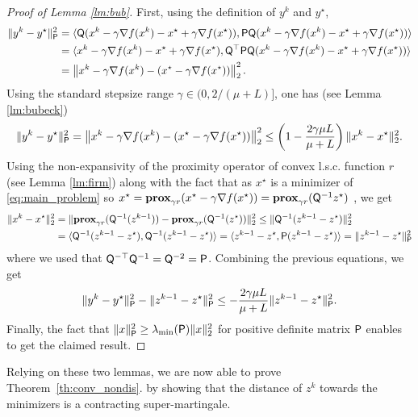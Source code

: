 \begin{proof}[Proof of Lemma \ref{lm:bub}]
First, using the definition of $y^k$ and $y^\star$,
\begin{align*}
  \|y^{k}-y^\star\|_{{\mathsf{P}}}^2
   &=
   \langle {\mathsf{Q}}(x^k - \gamma\nabla f(x^k) - x^\star + \gamma\nabla f(x^\star)), 
   {\mathsf{P}}{\mathsf{Q}}(x^k - \gamma\nabla f(x^k) - x^\star + \gamma\nabla f(x^\star)) \rangle\\
   &=
   \langle x^k - \gamma\nabla f(x^k) - x^\star + \gamma\nabla f(x^\star), {\mathsf{Q}}^\top{\mathsf{P}}{\mathsf{Q}} (x^k - \gamma\nabla f(x^k) - x^\star + \gamma\nabla f(x^\star)) \rangle\\
   &= \left\| x^k - \gamma\nabla f(x^k) - ( x^\star - \gamma\nabla f(x^\star) ) \right\|_2^2.
\end{align*}
Using the standard stepsize range $\gamma\in(0,2/(\mu+L)]$, one has (see Lemma \ref{lm:bubeck}) 
$$
 \|y^{k}-y^\star\|_{{\mathsf{P}}}^2 = \left\| x^k - \gamma\nabla f(x^k) - ( x^\star - \gamma\nabla f(x^\star) ) \right\|_2^2 \leq \left(1 - \frac{2\gamma\mu L}{\mu + L}\right)\|x^k - x^\star\|_2^2.
$$
Using the non-expansivity of the proximity operator of convex l.s.c. function $r$ (see Lemma \ref{lm:firm}) along with the fact that as $x^\star$ is a minimizer of \eqref{eq:main_problem} so $x^\star = \mathbf{prox}_{\gamma r}(x^\star - \gamma \nabla f(x^\star)) = \mathbf{prox}_{\gamma r}({\mathsf{Q}}^{-1}z^\star)$ \cite[Th. ~26.2]{bauschke2011convex}, we get
\begin{align*}
\|x^k - x^\star\|_2^2 &= \|\mathbf{prox}_{\gamma r}({\mathsf{Q}}^{-1}(z^{k-1})) - \mathbf{prox}_{\gamma r}({\mathsf{Q}}^{-1}(z^\star))\|_2^2\leq
\|{\mathsf{Q}}^{-1}(z^{k-1} - z^\star)\|_2^2 \\&= \langle {\mathsf{Q}}^{-1}(z^{k-1} - z^\star),{\mathsf{Q}}^{-1}(z^{k-1} - z^\star)\rangle = \langle z^{k-1} - z^\star,{\mathsf{P}}(z^{k-1} - z^\star)\rangle =  \|z^{k-1}-z^\star\|_{{\mathsf{P}}}^2
\end{align*}
where we used that ${\mathsf{Q}}^{-\top}{\mathsf{Q}}^{-1} = {\mathsf{Q}}^{-2} = {\mathsf{P}}$. Combining the previous equations, we get 
\begin{align*}
    \|y^{k}-y^\star\|_{{\mathsf{P}}}^2 -  \|z^{k-1}-z^\star\|_{{\mathsf{P}}}^2 \leq- \frac{2\gamma\mu L}{\mu + L} \|z^{k-1} - z^\star\|_{{\mathsf{P}}}^2.
\end{align*}
Finally, the fact that $\|x\|_{{\mathsf{P}}}^2 \geq \lambda_{\min}({\mathsf{P}})\|x\|_2^2$ for positive definite matrix ${\mathsf{P}}$ enables to get the claimed result.
\end{proof}


Relying on these two lemmas, we are now able to prove Theorem~\ref{th:conv_nondis}.
by showing that the distance of $z^k$ towards the minimizers is a contracting super-martingale. %

